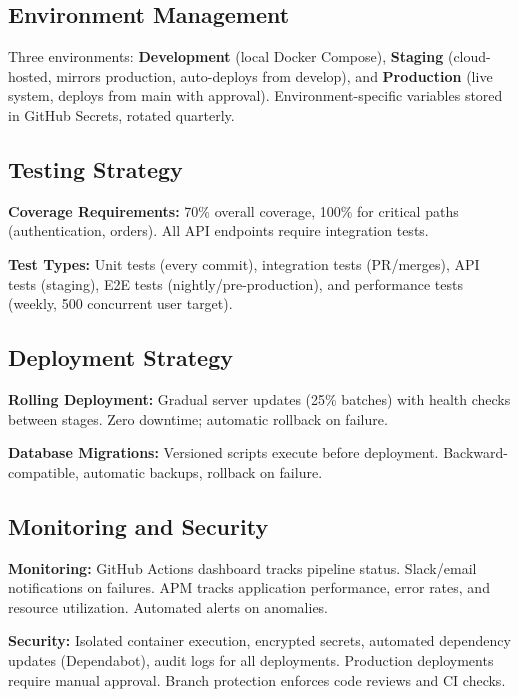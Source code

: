 \documentclass[12pt,a4paper]{article}
\begin{document}
\subsection{Environment Management}

Three environments: \textbf{Development} (local Docker Compose), \textbf{Staging} (cloud-hosted, mirrors production, auto-deploys from develop), and \textbf{Production} (live system, deploys from main with approval). Environment-specific variables stored in GitHub Secrets, rotated quarterly.

\subsection{Testing Strategy}

\textbf{Coverage Requirements:} 70\% overall coverage, 100\% for critical paths (authentication, orders). All API endpoints require integration tests.

\textbf{Test Types:} Unit tests (every commit), integration tests (PR/merges), API tests (staging), E2E tests (nightly/pre-production), and performance tests (weekly, 500 concurrent user target).

\subsection{Deployment Strategy}

\textbf{Rolling Deployment:} Gradual server updates (25\% batches) with health checks between stages. Zero downtime; automatic rollback on failure.

\textbf{Database Migrations:} Versioned scripts execute before deployment. Backward-compatible, automatic backups, rollback on failure.

\subsection{Monitoring and Security}

\textbf{Monitoring:} GitHub Actions dashboard tracks pipeline status. Slack/email notifications on failures. APM tracks application performance, error rates, and resource utilization. Automated alerts on anomalies.

\textbf{Security:} Isolated container execution, encrypted secrets, automated dependency updates (Dependabot), audit logs for all deployments. Production deployments require manual approval. Branch protection enforces code reviews and CI checks.
\end{document}
